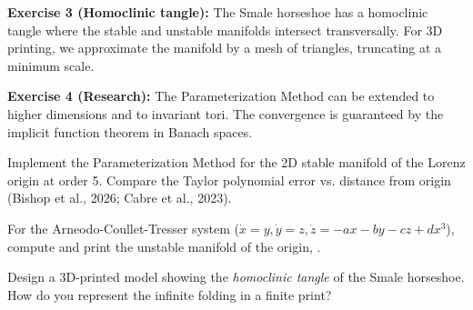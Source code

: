 \begin{solution}
\textbf{Exercise 3 (Homoclinic tangle):} The Smale horseshoe has a homoclinic tangle where the stable and unstable manifolds intersect transversally. For 3D printing, we approximate the manifold by a mesh of triangles, truncating at a minimum scale.
\end{solution}

\begin{solution}
\textbf{Exercise 4 (Research):} The Parameterization Method can be extended to higher dimensions and to invariant tori. The convergence is guaranteed by the implicit function theorem in Banach spaces.
\end{solution}

\label{sec:3dp:exercises}

\begin{exercise}
Implement the Parameterization Method for the 2D stable manifold
of the Lorenz origin at order 5. Compare the Taylor polynomial
error vs. distance from origin (Bishop et al., 2026; Cabre et al.,
2023).
\end{exercise}

\begin{exercise}
For the Arneodo-Coullet-Tresser system ($\dot{x}=y, \dot{y}=z,
\dot{z}=-ax-by-cz+dx^3$), compute and print the unstable manifold
of the origin, \cite{cabre2003parameterization}.
\end{exercise}

\begin{exercise}
Design a 3D-printed model showing the \emph{homoclinic tangle} of the Smale horseshoe. How do you represent the infinite folding in a finite print?
\end{exercise}